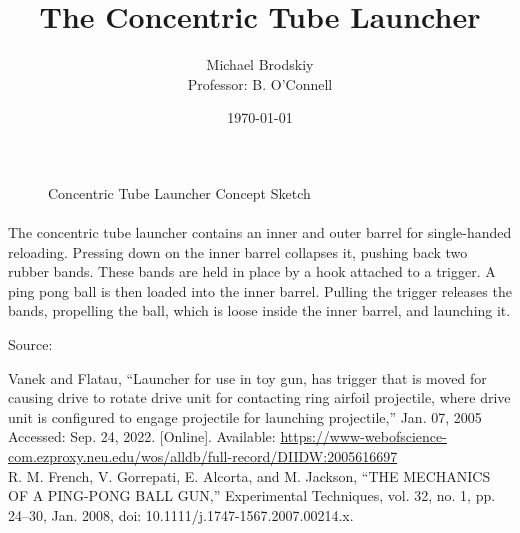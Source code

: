 


\title{The Concentric Tube Launcher}
\date{\today}
\author{Michael Brodskiy\\ \small Professor: B. O'Connell}



\maketitle

\begin{figure}[h!]
  \centering
  
  \caption{Concentric Tube Launcher Concept Sketch}
  \label{fig:1}
\end{figure}

\paragraph{} The concentric tube launcher contains an inner and outer barrel for single-handed reloading. Pressing down on the inner barrel collapses it, pushing back two rubber bands. These bands are held in place by a hook attached to a trigger. A ping pong ball is then loaded into the inner barrel. Pulling the trigger releases the bands, propelling the ball, which is loose inside the inner barrel, and launching it.

\newline
\vspace{25pt}

Source:

\text{[1]} Vanek and Flatau, “Launcher for use in toy gun, has trigger that is moved for causing drive to rotate drive unit for contacting ring airfoil projectile, where drive unit is configured to engage projectile for launching projectile,” Jan. 07, 2005 Accessed: Sep. 24, 2022. [Online]. Available: \href{https://www-webofscience-com.ezproxy.neu.edu/wos/alldb/full-record/DIIDW:2005616697}{https://www-webofscience-com.ezproxy.neu.edu/wos/alldb/full-record/DIIDW:2005616697}\\
\text{[2]} R. M. French, V. Gorrepati, E. Alcorta, and M. Jackson, “THE MECHANICS OF A PING-PONG BALL GUN,” Experimental Techniques, vol. 32, no. 1, pp. 24–30, Jan. 2008, doi: 10.1111/j.1747-1567.2007.00214.x.




